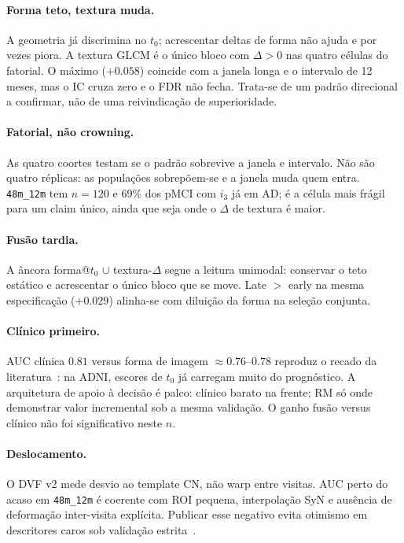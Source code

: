 \documentclass[review]{elsarticle}
\newcommand{\code}[1]{\texttt{#1}}
\begin{document}
	\paragraph{Forma teto, textura muda.}
	A geometria já discrimina no $t_0$; acrescentar deltas de forma não ajuda e por vezes piora.
	A textura GLCM é o único bloco com $\Delta>0$ nas quatro células do fatorial.
	O máximo ($+0.058$) coincide com a janela longa e o intervalo de 12 meses, mas o IC cruza zero e o FDR não fecha.
	Trata-se de um padrão direcional a confirmar, não de uma reivindicação de superioridade.
	
	\paragraph{Fatorial, não crowning.}
	As quatro coortes testam se o padrão sobrevive a janela e intervalo.
	Não são quatro réplicas: as populações sobrepõem-se e a janela muda quem entra.
	\code{48m\_12m} tem $n=120$ e 69\% dos pMCI com $i_3$ já em AD; é a célula mais frágil para um claim único, ainda que seja onde o $\Delta$ de textura é maior.
	
	\paragraph{Fusão tardia.}
	A âncora forma@$t_0$ $\cup$ textura-$\Delta$ segue a leitura unimodal: conservar o teto estático e acrescentar o único bloco que se move.
	Late $>$ early na mesma especificação ($+0.029$) alinha-se com diluição da forma na seleção conjunta.
	
	\paragraph{Clínico primeiro.}
	AUC clínica $0.81$ versus forma de imagem $\approx 0.76$--$0.78$ reproduz o recado da literatura~\cite{grassi-2019,moradi-2015}: na ADNI, escores de $t_0$ já carregam muito do prognóstico.
	A arquitetura de apoio à decisão é palco: clínico barato na frente; RM só onde demonstrar valor incremental sob a mesma validação.
	O ganho fusão versus clínico não foi significativo neste $n$.
	
	\paragraph{Deslocamento.}
	O DVF v2 mede desvio ao template CN, não warp entre visitas.
	AUC perto do acaso em \code{48m\_12m} é coerente com ROI pequena, interpolação SyN e ausência de deformação inter-visita explícita.
	Publicar esse negativo evita otimismo em descritores caros sob validação estrita~\cite{cuingnet-2011}.
	
\end{document}
